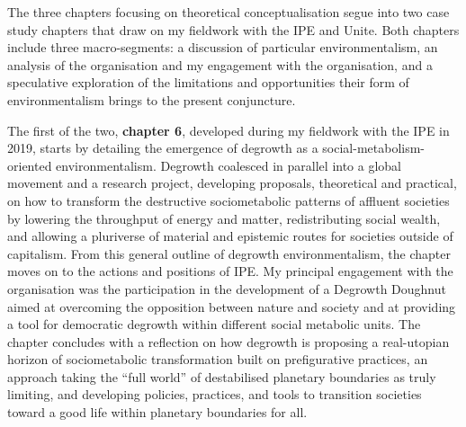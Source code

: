 \documentclass[a4paper, nobind]{templates/ociamthesis}
\begin{document}
The three chapters focusing on theoretical conceptualisation segue into two case study chapters that draw on my fieldwork with the IPE and Unite. Both chapters include three macro-segments: a discussion of particular environmentalism, an analysis of the organisation and my engagement with the organisation, and a speculative exploration of the limitations and opportunities their form of environmentalism brings to the present conjuncture.

The first of the two, \textbf{chapter 6}, developed during my fieldwork with the IPE in 2019, starts by detailing the emergence of degrowth as a social-metabolism-oriented environmentalism. Degrowth coalesced in parallel into a global movement and a research project, developing proposals, theoretical and practical, on how to transform the destructive sociometabolic patterns of affluent societies by lowering the throughput of energy and matter, redistributing social wealth, and allowing a pluriverse of material and epistemic routes for societies outside of capitalism. From this general outline of degrowth environmentalism, the chapter moves on to the actions and positions of IPE. My principal engagement with the organisation was the participation in the development of a Degrowth Doughnut aimed at overcoming the opposition between nature and society and at providing a tool for democratic degrowth within different social metabolic units. The chapter concludes with a reflection on how degrowth is proposing a real-utopian horizon of sociometabolic transformation built on prefigurative practices, an approach taking the ``full world'' of destabilised planetary boundaries as truly limiting, and developing policies, practices, and tools to transition societies toward a good life within planetary boundaries for all.
\end{document}
